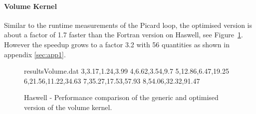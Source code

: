 \documentclass{acm_proc_article-sp}
\begin{document}

\paragraph{Volume Kernel}
Similar to the runtime measurements of the Picard loop, the optimised version is about a factor of 1.7 faster than the Fortran version on Haswell, see Figure~\ref{fig:resultsVolume}. However the speedup grows to a factor 3.2 with 56 quantities as shown in appendix \ref{sec:app1}.

\begin{figure}
\begin{filecontents}{resultsVolume.dat}
3,3.17,1.24,3.99
4,6.62,3.54,9.7
5,12.86,6.47,19.25
6,21.56,11.22,34.63
7,35.27,17.53,57.93
8,54.06,32.32,91.47
\end{filecontents}
\caption{Haswell - Performance comparison of the generic and optimised version of the volume kernel.}\label{fig:resultsVolume}
\end{figure}
\end{document}

